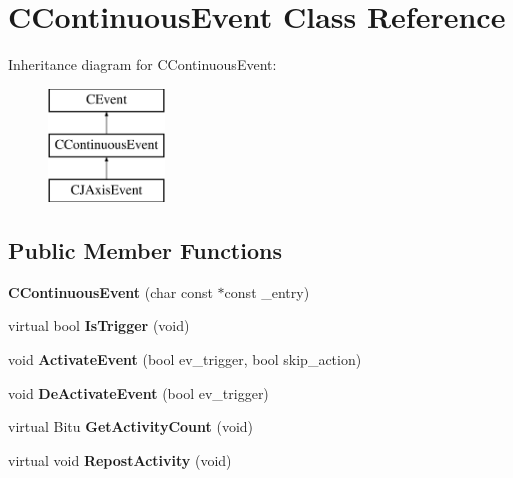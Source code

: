 \hypertarget{classCContinuousEvent}{\section{C\-Continuous\-Event Class Reference}
\label{classCContinuousEvent}
}
Inheritance diagram for C\-Continuous\-Event\-:\begin{figure}[H]
\begin{center}
\leavevmode
\includegraphics[height=3.000000cm]{classCContinuousEvent}
\end{center}
\end{figure}
\subsection*{Public Member Functions}
\begin{DoxyCompactItemize}
\item 
\hypertarget{classCContinuousEvent_ac998a6e07ae19db1bd6000b26f3b2a56}{{\bfseries C\-Continuous\-Event} (char const $\ast$const \-\_\-entry)}\label{classCContinuousEvent_ac998a6e07ae19db1bd6000b26f3b2a56}

\item 
\hypertarget{classCContinuousEvent_a7d1e187b39ea746e8aabf70d7c176d4f}{virtual bool {\bfseries Is\-Trigger} (void)}\label{classCContinuousEvent_a7d1e187b39ea746e8aabf70d7c176d4f}

\item 
\hypertarget{classCContinuousEvent_a3b2815847a046746c02c8a2841aa2bfb}{void {\bfseries Activate\-Event} (bool ev\-\_\-trigger, bool skip\-\_\-action)}\label{classCContinuousEvent_a3b2815847a046746c02c8a2841aa2bfb}

\item 
\hypertarget{classCContinuousEvent_a025ebb767d3d067f52fb342126627c6d}{void {\bfseries De\-Activate\-Event} (bool ev\-\_\-trigger)}\label{classCContinuousEvent_a025ebb767d3d067f52fb342126627c6d}

\item 
\hypertarget{classCContinuousEvent_a3185a87873f79aea8c23054b55c1ceac}{virtual Bitu {\bfseries Get\-Activity\-Count} (void)}\label{classCContinuousEvent_a3185a87873f79aea8c23054b55c1ceac}

\item 
\hypertarget{classCContinuousEvent_a55ff5be014e082075eaeec0af43a51aa}{virtual void {\bfseries Repost\-Activity} (void)}\label{classCContinuousEvent_a55ff5be014e082075eaeec0af43a51aa}

\end{DoxyCompactItemize}


